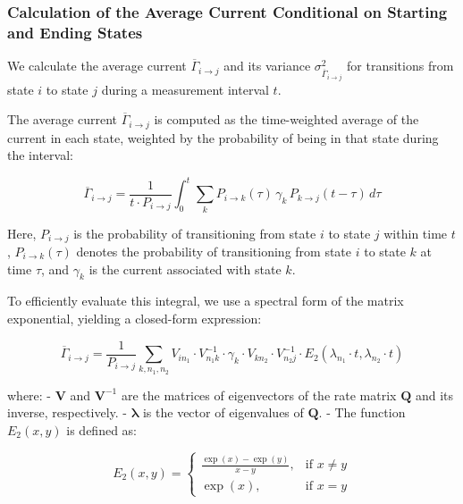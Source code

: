 \documentclass[pdflatex,sn-mathphys-num]{sn-jnl}%
\theoremstyle{thmstyleone}%
\theoremstyle{thmstyletwo}%
\theoremstyle{thmstylethree}%
\begin{document}
\subsubsection{Calculation of the Average Current Conditional on Starting and Ending States}

We calculate the average current \( \overline{\Gamma}_{i \rightarrow j} \) and its variance \( \sigma^2_{\overline{\Gamma}_{i \rightarrow j}} \) for transitions from state \( i \) to state \( j \) during a measurement interval \( t \).

The average current \( \overline{\Gamma}_{i \rightarrow j} \) is computed as the time-weighted average of the current in each state, weighted by the probability of being in that state during the interval:

\begin{equation}
	\overline{\Gamma}_{i \rightarrow j} = \frac{1}{t \cdot P_{i \rightarrow j}} \int_0^t \sum_k P_{i \rightarrow k}(\tau) \, \gamma_k \, P_{k \rightarrow j}(t - \tau) \, d\tau
	\label{eq:gamma_ij_integral}
\end{equation}

Here, \( P_{i \rightarrow j} \) is the probability of transitioning from state \( i \) to state \( j \) within time \( t \), \( P_{i \rightarrow k}(\tau) \) denotes the probability of transitioning from state \( i \) to state \( k \) at time \( \tau \), and \( \gamma_k \) is the current associated with state \( k \).

To efficiently evaluate this integral, we use a spectral form of the matrix exponential, yielding a closed-form expression:

\begin{equation}
	\overline{\Gamma}_{i \rightarrow j} = \frac{1}{P_{i \rightarrow j}} \sum_{k, n_1, n_2} V_{i n_1} \cdot V^{-1}_{n_1 k} \cdot \gamma_k \cdot V_{k n_2} \cdot V^{-1}_{n_2 j} \cdot E_2(\lambda_{n_1} \cdot t, \lambda_{n_2} \cdot t)
	\label{eq:gamma_ij_formula}
\end{equation}

where:
- \( \mathbf{V} \) and \( \mathbf{V}^{-1} \) are the matrices of eigenvectors of the rate matrix \( \mathbf{Q} \) and its inverse, respectively.
- \( \boldsymbol{\lambda} \) is the vector of eigenvalues of \( \mathbf{Q} \).
- The function \( E_2(x, y) \) is defined as:

\begin{equation}
	E_2(x, y) = 
	\begin{cases}
		\frac{\exp(x) - \exp(y)}{x - y}, & \text{if } x \neq y \\
		\exp(x), & \text{if } x = y
	\end{cases}
	\label{eq:E_2}
\end{equation}
\end{document}
